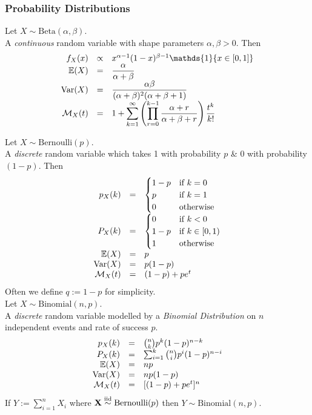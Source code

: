 \documentclass[11pt,a4paper]{article}
\begin{document}
\subsubsection{Probability Distributions}

Let $X\sim\text{Beta}(\alpha,\beta)$.\\
A \textit{continuous} random variable with shape parameters $\alpha,\beta>0$. Then
\[\begin{array}{rcl}
f_X(x)&\propto&x^{\alpha-1}(1-x)^{\beta-1}\mathds{1}\{x\in[0,1]\}\\
\expect(X)&=&\dfrac{\alpha}{\alpha+\beta}\\
\var(X)&=&\dfrac{\alpha\beta}{(\alpha+\beta)^2(\alpha+\beta+1)}\\
\mathcal{M}_X(t)&=&1+{\displaystyle\sum_{k=1}^\infty\left(\prod_{r=0}^{k-1}\dfrac{\alpha+r}{\alpha+\beta+r}\right)\dfrac{t^k}{k!}}
\end{array}\]

Let $X\sim\text{Bernoulli}(p)$.\\
A \textit{discrete} random variable which takes 1 with probability $p$ \& 0 with probability $(1-p)$. Then
\[\begin{array}{rcl}
p_X(k)&=&\begin{cases}1-p&\text{if }k=0\\p&\text{if }k=1\\0&\text{otherwise}\end{cases}\\
P_X(k)&=&\begin{cases}0&\text{if }k<0\\1-p&\text{if }k\in[0,1)\\1&\text{otherwise}\end{cases}\\
\mathbb{E}(X)&=&p\\
\mathrm{Var}(X)&=&p(1-p)\\
\mathcal{M}_X(t)&=&(1-p)+pe^t
\end{array}\]
\nb Often we define $q:=1-p$ for simplicity.\\

Let $X\sim\text{Binomial}(n,p)$.\\
A \textit{discrete} random variable modelled by a \textit{Binomial Distribution} on $n$ independent events and rate of success $p$.\\
\[\begin{array}{rcl}
p_X(k)&=&{n\choose k}p^k(1-p)^{n-k}\\
P_X(k)&=&\sum_{i=1}^k{n\choose i}p^i(1-p)^{n-i}\\
\mathbb{E}(X)&=&np\\
\mathrm{Var}(X)&=&np(1-p)\\
\mathcal{M}_X(t)&=&[(1-p)+pe^t]^n
\end{array}\]
\nb If $Y:=\sum_{i=1}^nX_i$ where $\textbf{X}\overset{\text{iid}}{\sim}\text{Bernoulli}(p)$ then $Y\sim\text{Binomial}(n,p)$.\\
\end{document}
